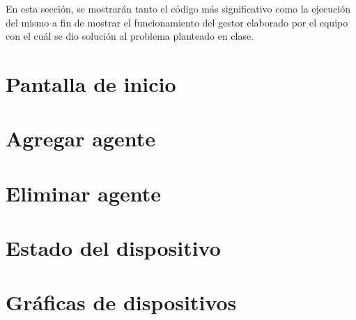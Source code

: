 En esta sección, se mostrarán tanto el código más significativo como la ejecución del mismo a fin de mostrar el funcionamiento del gestor elaborado por el equipo con el cuál se dio solución al problema planteado en clase.
\section{Pantalla de inicio}
\section{Agregar agente}
\section{Eliminar agente}
\section{Estado del dispositivo}
\section{Gráficas de dispositivos}




